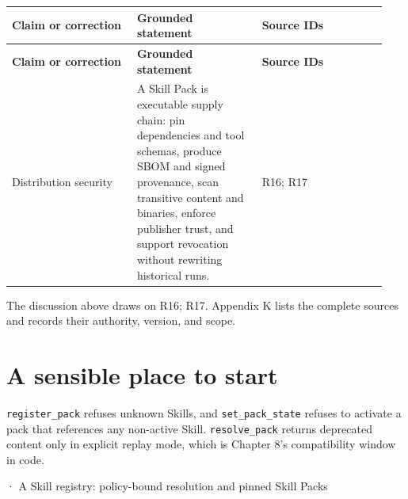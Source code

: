 \BookTableStart
\small
\begin{longtable}{@{}Y{0.3133\linewidth}Y{0.3133\linewidth}Y{0.3133\linewidth}@{}}
\color{white}\bfseries \textbf{Claim or correction} & \color{white}\bfseries \textbf{Grounded statement} & \color{white}\bfseries \textbf{Source IDs} \\
\endfirsthead
{}
\color{white}\bfseries \textbf{Claim or correction} & \color{white}\bfseries \textbf{Grounded statement} & \color{white}\bfseries \textbf{Source IDs} \\
\endhead
Distribution security & A Skill Pack is executable supply chain: pin dependencies and tool schemas, produce SBOM and signed provenance, scan transitive content and binaries, enforce publisher trust, and support revocation without rewriting historical runs. & R16; R17 \\
\end{longtable}
\BookTableEnd

The discussion above draws on R16; R17. Appendix K lists the complete sources and records their authority, version, and scope.\par

\section{A sensible place to start}

\lstinline[style=bookinline]!register_pack! refuses unknown Skills, and \lstinline[style=bookinline]!set_pack_state! refuses to activate a pack that references any non-active Skill. \lstinline[style=bookinline]!resolve_pack! returns deprecated content only in explicit replay mode, which is Chapter 8's compatibility window in code.\par

\BookSnake · A Skill registry: policy-bound resolution and pinned Skill Packs\par

